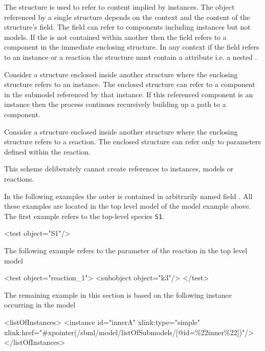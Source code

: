 \documentclass{cekarticle}
\begin{document}
The  structure is used to refer to content implied by instances.  The object referenced by a single 
structure depends on the context and the content of the structure's 
field.  
The  field can refer to components including 
instances but not models.  
If the  is not contained within another
 then the  field refers to a component in the
immediate enclosing  structure.  In any context if the 
field refers to an instance or a reaction the  structure must
contain a  attribute i.e. a nested .

Consider a  structure enclosed inside another 
structure where the enclosing structure refers to an instance.
The enclosed structure can refer to a component in the
submodel referenced by that instance.  If this referenced component is an
instance then the process continues recursively building up a path to a component.

Consider a  structure enclosed inside another 
structure where the enclosing structure refers to a reaction.
The enclosed structure can refer only to parameters defined within the reaction.

This scheme deliberately cannot create references to instances, models or reactions.

In the following examples the outer  is contained in arbitrarily
named field .  All these examples are located in the top level model
of the model example above.  The first example refers to the top-level
species \texttt{S1}.

\begin{example}
<test object="S1"/>
\end{example}

The following example refers to the parameter of the reaction in the top level model

\begin{example}
<test object="reaction_1">
    <subobject object="k3"/>
</test>
\end{example}

The remaining example in this section is based on the following instance occurring in the model

\begin{example}
<listOfInstances>
    <instance
        id="innerA" 
        xlink:type="simple" 
        xlink:href="#xpointer(/sbml/model/listOfSubmodels/[@id=\%22inner\%22])"/>
</listOfInstances>
\end{example}
\end{document}
